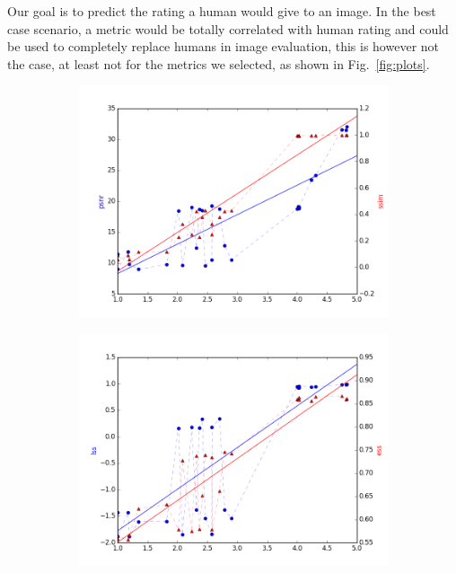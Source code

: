 \documentclass{article}
\begin{document}


Our goal is to predict the rating a human would give to an image. In the best case scenario, a metric would be totally correlated with human rating and could be used to completely replace humans in image evaluation, this is however not the case, at least not for the metrics we selected, as shown in Fig.~\ref{fig:plots}.

\begin{figure}[ht]
\centering
\begin{subfigure}{4.3cm}
  \centering
  \includegraphics[width=1\linewidth]{figures/mos_ssim}
  \caption{}
  \label{fig:sub1}
\end{subfigure}%
\begin{subfigure}{4.3cm}
  \centering
  \includegraphics[width=1\linewidth]{figures/mos_ess}

\end{subfigure}
\end{figure}
\end{document}
